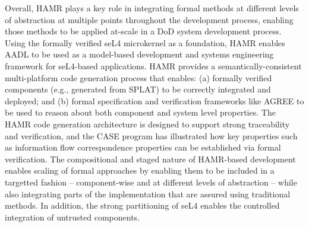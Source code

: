 Overall, HAMR plays a key role in integrating formal methods
at different levels of abstraction at multiple points throughout
the development process, enabling those methods to be applied
at-scale in a DoD system development process.   Using the
formally verified seL4 microkernel as a foundation, HAMR enables
AADL to be used as a model-based development and systems
engineering framework for seL4-based applications.
HAMR provides a semantically-consistent multi-platform code
generation process that enables: (a) formally verified components
(e.g., generated from SPLAT) to be correctly integrated and
deployed; and (b) formal specification and verification frameworks
like AGREE to be used to reason about both component and system
level properties.   The HAMR code generation architecture is
designed to support strong traceability and verification, and
the CASE program has illustrated how key properties such as
information flow correspondence properties can be established
via formal verification.   The compositional and staged nature
of HAMR-based development enables scaling of formal approaches
by enabling them to be included in a targetted fashion --
component-wise and at different levels of abstraction -- while
also integrating parts of the implementation that are assured
using traditional methods.   In addition, the strong partitioning
of seL4 enables the controlled integration of untrusted components.



